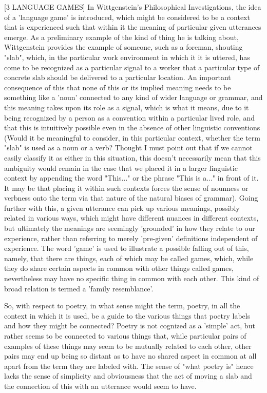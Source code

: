 \documentclass[]{article}
\begin{document}
[3 LANGUAGE GAMES] In Wittgenstein's Philosophical Investigations, the idea of a 'language game' is introduced, which might be considered to be a context that is experienced such that within it the meaning of particular given utterances emerge. As a preliminary example of the kind of thing he is talking about, Wittgenstein provides the example of someone, such as a foreman, shouting "slab", which, in the particular work environment in which it it is uttered, has come to be recognized as a particular signal to a worker that a particular type of concrete slab should be delivered to a particular location. An important consequence of this that none of this or its implied meaning needs to be something like a 'noun' connected to any kind of wider language or grammar, and this meaning takes upon its role as a signal, which is what it means, due to it being recognized by a person as a convention within a particular lived role, and that this is intuitively possible even in the absence of other linguistic conventions (Would it be meaningful to consider, in this particular context, whether the term "slab" is used as a noun or a verb? Thought I must point out that if we cannot easily classify it as either in this situation, this doesn't necessarily mean that this ambiguity would remain in the case that we placed it in a larger linguistic context by appending the word "This..." or the phrase "This is a..." in front of it. It may be that placing it within such contexts forces the sense of nounness or verbness onto  the term via that nature of the natural biases of grammar). Going further with this, a given utterance can pick up various meanings, possibly related in various ways, which might have different nuances in different contexts, but ultimately the meanings are seemingly 'grounded' in how they relate to our experience, rather than referring to merely 'pre-given' definitions independent of experience. The word 'game' is used to illustrate a possible falling out of this, namely, that there are things, each of which may be called games, which, while they do share certain aspects in common with other things called games, nevertheless may have no specific thing in common with each other. This kind of broad relation is termed a 'family resemblance'.

So, with respect to poetry, in what sense might the term, poetry, in all the context in which it is used, be a guide to the various things that poetry labels and how they might be connected? Poetry is not cognized as a 'simple' act, but rather seems to be connected to various things that, while particular pairs of examples of these things may seem to be mutually related to each other, other pairs may end up being so distant as to have no shared aspect in common at all apart from the term they are labeled with. The sense of "what poetry is" hence lacks the sense of simplicity and obviousness that the act of moving a slab and the connection of this with an utterance would seem to have.
\end{document}
